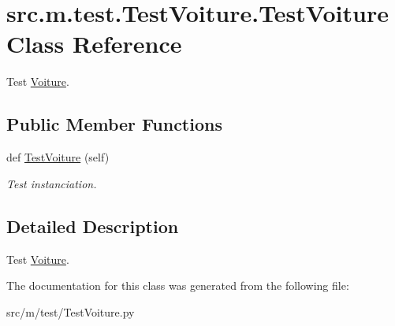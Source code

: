 \hypertarget{classsrc_1_1m_1_1test_1_1_test_voiture_1_1_test_voiture}{}\section{src.\+m.\+test.\+Test\+Voiture.\+Test\+Voiture Class Reference}
\label{classsrc_1_1m_1_1test_1_1_test_voiture_1_1_test_voiture}


Test \hyperlink{namespacesrc_1_1m_1_1_voiture}{Voiture}.  


\subsection*{Public Member Functions}
\begin{DoxyCompactItemize}
\item 
\hypertarget{classsrc_1_1m_1_1test_1_1_test_voiture_1_1_test_voiture_a78d20221858314b35f0adaeb05698f1e}{}def \hyperlink{classsrc_1_1m_1_1test_1_1_test_voiture_1_1_test_voiture_a78d20221858314b35f0adaeb05698f1e}{Test\+Voiture} (self)\label{classsrc_1_1m_1_1test_1_1_test_voiture_1_1_test_voiture_a78d20221858314b35f0adaeb05698f1e}

\begin{DoxyCompactList}\small\item\em Test instanciation. \end{DoxyCompactList}\end{DoxyCompactItemize}


\subsection{Detailed Description}
Test \hyperlink{namespacesrc_1_1m_1_1_voiture}{Voiture}. 

The documentation for this class was generated from the following file\+:\begin{DoxyCompactItemize}
\item 
src/m/test/Test\+Voiture.\+py\end{DoxyCompactItemize}
